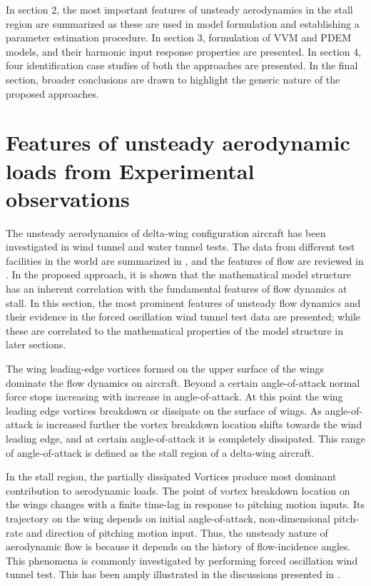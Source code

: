 \documentclass{AIAA}
\begin{document}
In section $2$, the most important features of unsteady aerodynamics in the stall region are summarized as these are used in model formulation and establishing a parameter estimation procedure. In section $3$, formulation of VVM and PDEM models, and their harmonic input response properties are presented. In section $4$, four identification case studies of both the approaches are presented. In the final section, broader conclusions are drawn to highlight the generic nature of the proposed approaches.


\section{Features of unsteady aerodynamic loads from Experimental observations}
The unsteady aerodynamics of delta-wing configuration aircraft has been investigated in wind tunnel and water tunnel tests. The data from different test facilities in the world are summarized in \cite{AGARDAR305}, and the features of flow are reviewed in \cite{Gursul,Nelson}. In the proposed approach, it is shown that the mathematical model structure has an inherent correlation with the fundamental features of flow dynamics at stall. In this section, the most prominent features of unsteady flow dynamics and their evidence in the forced oscillation wind tunnel test data are presented; while these are correlated to the mathematical properties of the model structure in later sections.


The wing leading-edge vortices formed on the upper surface of the wings dominate the flow dynamics on aircraft. Beyond a certain angle-of-attack normal force stops increasing with increase in angle-of-attack. At this point the wing leading edge vortices breakdown or dissipate on the surface of wings. As angle-of-attack is increased further the vortex breakdown location shifts towards the wind leading edge, and at certain angle-of-attack it is completely dissipated. This range of angle-of-attack is defined as the stall region of a delta-wing aircraft.


In the stall region, the partially dissipated Vortices produce most dominant contribution to aerodynamic loads.  The point of vortex breakdown location on the wings changes with a finite time-lag in response to pitching motion inputs. Its trajectory on the wing depends on initial angle-of-attack, non-dimensional pitch-rate and direction of pitching motion input. Thus, the unsteady nature of aerodynamic flow is because it depends on the history of flow-incidence angles. This phenomena is commonly investigated by performing forced oscillation wind tunnel test. This has been amply illustrated in the discussions presented in \cite{Nelson}. 
\end{document}
